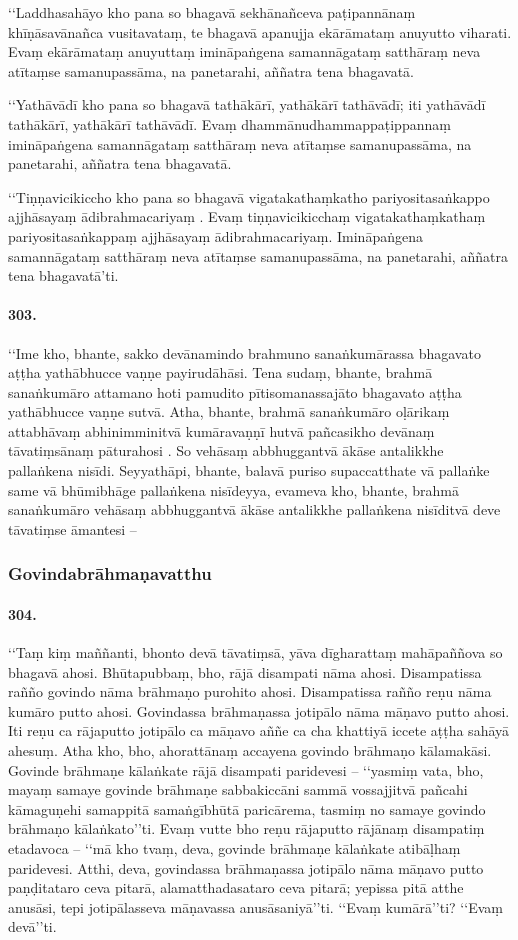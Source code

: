 ‘‘Laddhasahāyo kho pana so bhagavā sekhānañceva paṭipannānaṃ khīṇāsavānañca vusitavataṃ, te bhagavā apanujja ekārāmataṃ anuyutto viharati. Evaṃ ekārāmataṃ anuyuttaṃ imināpaṅgena samannāgataṃ satthāraṃ neva atītaṃse samanupassāma, na panetarahi, aññatra tena bhagavatā.

‘‘Yathāvādī kho pana so bhagavā tathākārī, yathākārī tathāvādī; iti yathāvādī tathākārī, yathākārī tathāvādī. Evaṃ dhammānudhammappaṭippannaṃ imināpaṅgena samannāgataṃ satthāraṃ neva atītaṃse samanupassāma, na panetarahi, aññatra tena bhagavatā.

‘‘Tiṇṇavicikiccho kho pana so bhagavā vigatakathaṃkatho pariyositasaṅkappo ajjhāsayaṃ ādibrahmacariyaṃ . Evaṃ tiṇṇavicikicchaṃ vigatakathaṃkathaṃ pariyositasaṅkappaṃ ajjhāsayaṃ ādibrahmacariyaṃ. Imināpaṅgena samannāgataṃ satthāraṃ neva atītaṃse samanupassāma, na panetarahi, aññatra tena bhagavatā’ti.

\paragraph{303.} ‘‘Ime kho, bhante, sakko devānamindo brahmuno sanaṅkumārassa bhagavato aṭṭha yathābhucce vaṇṇe payirudāhāsi. Tena sudaṃ, bhante, brahmā sanaṅkumāro attamano hoti pamudito pītisomanassajāto bhagavato aṭṭha yathābhucce vaṇṇe sutvā. Atha, bhante, brahmā sanaṅkumāro oḷārikaṃ attabhāvaṃ abhinimminitvā kumāravaṇṇī hutvā pañcasikho devānaṃ tāvatiṃsānaṃ pāturahosi . So vehāsaṃ abbhuggantvā ākāse antalikkhe pallaṅkena nisīdi. Seyyathāpi, bhante, balavā puriso supaccatthate vā pallaṅke same vā bhūmibhāge pallaṅkena nisīdeyya, evameva kho, bhante, brahmā sanaṅkumāro vehāsaṃ abbhuggantvā ākāse antalikkhe pallaṅkena nisīditvā deve tāvatiṃse āmantesi –

\subsubsection{Govindabrāhmaṇavatthu}

\paragraph{304.} ‘‘Taṃ kiṃ maññanti, bhonto devā tāvatiṃsā, yāva dīgharattaṃ mahāpaññova so bhagavā ahosi. Bhūtapubbaṃ, bho, rājā disampati nāma ahosi. Disampatissa rañño govindo nāma brāhmaṇo purohito ahosi. Disampatissa rañño reṇu nāma kumāro putto ahosi. Govindassa brāhmaṇassa jotipālo nāma māṇavo putto ahosi. Iti reṇu ca rājaputto jotipālo ca māṇavo aññe ca cha khattiyā iccete aṭṭha sahāyā ahesuṃ. Atha kho, bho, ahorattānaṃ accayena govindo brāhmaṇo kālamakāsi. Govinde brāhmaṇe kālaṅkate rājā disampati paridevesi – ‘‘yasmiṃ vata, bho, mayaṃ samaye govinde brāhmaṇe sabbakiccāni sammā vossajjitvā pañcahi kāmaguṇehi samappitā samaṅgībhūtā paricārema, tasmiṃ no samaye govindo brāhmaṇo kālaṅkato’’ti. Evaṃ vutte bho reṇu rājaputto rājānaṃ disampatiṃ etadavoca – ‘‘mā kho tvaṃ, deva, govinde brāhmaṇe kālaṅkate atibāḷhaṃ paridevesi. Atthi, deva, govindassa brāhmaṇassa jotipālo nāma māṇavo putto paṇḍitataro ceva pitarā, alamatthadasataro ceva pitarā; yepissa pitā atthe anusāsi, tepi jotipālasseva māṇavassa anusāsaniyā’’ti. ‘‘Evaṃ kumārā’’ti? ‘‘Evaṃ devā’’ti.

